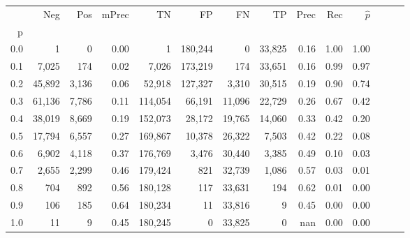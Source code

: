 \begin{tabular}{rrrrrrrrrrrrrr}
\toprule
{} &     Neg &    Pos & mPrec &       TN &       FP &      FN &      TP &  Prec &   Rec & $\hat{p}$ \\
p   &         &        &       &          &          &         &         &       &       &           \\
\midrule
0.0 &       1 &      0 &  0.00 &        1 &  180,244 &       0 &  33,825 &  0.16 &  1.00 &      1.00 \\
0.1 &   7,025 &    174 &  0.02 &    7,026 &  173,219 &     174 &  33,651 &  0.16 &  0.99 &      0.97 \\
0.2 &  45,892 &  3,136 &  0.06 &   52,918 &  127,327 &   3,310 &  30,515 &  0.19 &  0.90 &      0.74 \\
0.3 &  61,136 &  7,786 &  0.11 &  114,054 &   66,191 &  11,096 &  22,729 &  0.26 &  0.67 &      0.42 \\
0.4 &  38,019 &  8,669 &  0.19 &  152,073 &   28,172 &  19,765 &  14,060 &  0.33 &  0.42 &      0.20 \\
0.5 &  17,794 &  6,557 &  0.27 &  169,867 &   10,378 &  26,322 &   7,503 &  0.42 &  0.22 &      0.08 \\
0.6 &   6,902 &  4,118 &  0.37 &  176,769 &    3,476 &  30,440 &   3,385 &  0.49 &  0.10 &      0.03 \\
0.7 &   2,655 &  2,299 &  0.46 &  179,424 &      821 &  32,739 &   1,086 &  0.57 &  0.03 &      0.01 \\
0.8 &     704 &    892 &  0.56 &  180,128 &      117 &  33,631 &     194 &  0.62 &  0.01 &      0.00 \\
0.9 &     106 &    185 &  0.64 &  180,234 &       11 &  33,816 &       9 &  0.45 &  0.00 &      0.00 \\
1.0 &      11 &      9 &  0.45 &  180,245 &        0 &  33,825 &       0 &   nan &  0.00 &      0.00 \\
\bottomrule
\end{tabular}
